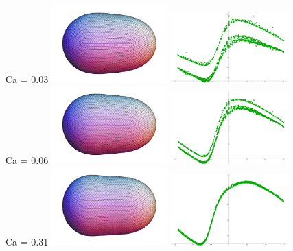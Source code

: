\documentclass[12pt]{article}
\numberwithin{equation}{section}
\begin{document}
\pagebreak
\begin{figure}[h]
\begin{center}
	Ca = 0.03
	\includegraphics[width=0.4\textwidth]{shape/shape_vred95_conf95_v1eb20}
	\includegraphics[width=0.4\textwidth]{tension/tension_vred95_conf95_v1eb20}
	\\
	Ca = 0.06
	\includegraphics[width=0.4\textwidth]{shape/shape_vred95_conf95_v1eb10}
	\includegraphics[width=0.4\textwidth]{tension/tension_vred95_conf95_v1eb10}
	\\
	Ca = 0.31
	\includegraphics[width=0.4\textwidth]{shape/shape_vred95_conf95_v1eb2}
	\includegraphics[width=0.4\textwidth]{tension/tension_vred95_conf95_v1eb2}

\end{center}
\end{figure}
\end{document}
